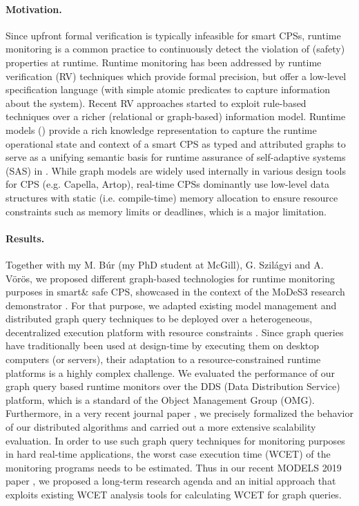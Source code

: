 \paragraph{Motivation.} 
Since upfront formal verification is typically infeasible for smart CPSs, runtime monitoring is a common practice to continuously detect the violation of (safety) properties at runtime. Runtime monitoring has been addressed by runtime verification (RV) techniques \cite{Leucker2009,Mitsch2014} which provide formal precision, but offer a low-level specification language (with simple atomic predicates to capture information about the system). Recent RV approaches \cite{Havelund2015} started to exploit rule-based techniques over a richer (relational or graph-based) information model. 
Runtime models (\cite{BlairBF09,Szvetits2013}) provide a rich knowledge representation to capture the runtime operational state and context of a smart CPS as typed and attributed graphs to serve as a unifying semantic basis for runtime assurance of self-adaptive systems (SAS) in \cite{Cheng2014,Vogel2014}. While graph models are widely used internally in various design tools for CPS (e.g. Capella, Artop), real-time CPSs dominantly use low-level data structures with static (i.e. compile-time) memory allocation to ensure resource constraints such as memory limits or deadlines, which is a major limitation.

\paragraph{Results.}
Together with my M. Búr (my PhD student at McGill), G. Szilágyi and A. Vörös, we proposed different graph-based technologies for runtime monitoring purposes in smart\& safe CPS, showcased in the context of the MoDeS3 research demonstrator \cite{nfm2018}. For that purpose, we adapted existing model management and distributed graph query techniques to be deployed over a heterogeneous, decentralized execution platform with resource constraints \cite{fase2018-cps}.  Since graph queries have traditionally been used at design-time by executing them on desktop computers (or servers), their adaptation to a resource-constrained runtime platforms is a highly complex challenge. 
We evaluated the performance of our graph query based runtime monitors \cite{wf-iot-2019} over the DDS (Data Distribution Service) platform, which is a standard of the Object Management Group (OMG). Furthermore, in a very recent journal paper \cite{sttt-2019-cps}, we precisely formalized the behavior of our distributed algorithms and carried out a more extensive scalability evaluation. 
In order to use such graph query techniques for monitoring purposes in hard real-time applications, the worst case execution time (WCET) of the monitoring programs needs to be estimated. Thus in our recent MODELS 2019 paper \cite{models2019-wcet}, we proposed a long-term research agenda and an initial approach that exploits existing WCET analysis tools for calculating WCET for graph queries.

